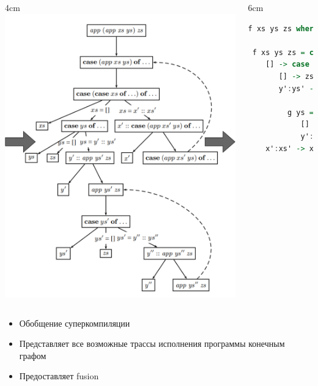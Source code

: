 \documentclass[xcolor=table,aspectratio=169]{beamer}
\begin{document}
\begin{frame}[fragile]
\begin{columns}
\begin{column}{4cm}
\includegraphics[width=\textwidth]{pictures/test.drawio.pdf}

\end{column}
    
    \hfill
\begin{column}{6cm}
\begin{lstlisting}[language=Haskell]
f xs ys zs where

 f xs ys zs = case xs of
    [] -> case ys of
       [] -> zs
       y':ys' -> y': (g ys') where
          
         g ys = case ys of
            [] -> zs
            y':ys' -> y':(g ys')
    x':xs' -> x':(f xs' ys zs)
\end{lstlisting}
\end{column}
      

\end{columns}

\begin{itemize}
    \item Обобщение суперкомпиляции
    \vfill
    \item Представляет все возможные трассы исполнения программы конечным графом
    \vfill
    \item Предоставляет \textcolor{codepurple}{fusion}
\end{itemize}

\end{frame}
  
\end{document}
